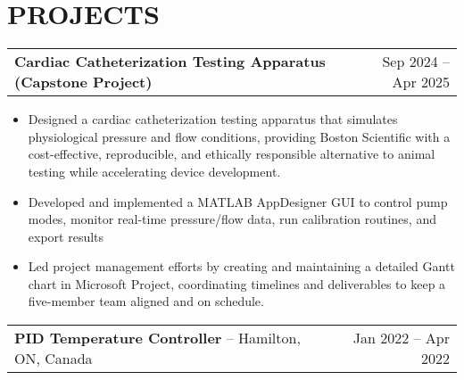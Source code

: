 \documentclass[a4paper,10pt]{article}
\begin{document}
\section{PROJECTS}
\begin{tabularx}{\linewidth}{@{}X r@{}}
\begin{minipage}[t]{\linewidth}
  \textbf{Cardiac Catheterization Testing Apparatus (Capstone Project)}
\end{minipage}
&     Sep 2024 -- Apr 2025
\end{tabularx}
\begin{itemize}[nosep,after=\strut, leftmargin=1em, itemsep=3pt,label=--]
  \item Designed a cardiac catheterization testing apparatus that simulates physiological pressure and flow conditions, providing Boston Scientific with a cost-effective, reproducible, and ethically responsible alternative to animal testing while accelerating device development.
\item Developed and implemented a MATLAB AppDesigner GUI to control pump modes, monitor real-time pressure/flow data, run calibration routines, and export results
\item Led project management efforts by creating and maintaining a detailed Gantt chart in Microsoft Project, coordinating timelines and deliverables to keep a five-member team aligned and on schedule.
\end{itemize}
\begin{tabularx}{\linewidth}{@{}X r@{}}
\begin{minipage}[t]{\linewidth}
  \textbf{PID Temperature Controller}
 -- Hamilton, ON, Canada\end{minipage}
&     Jan 2022 -- Apr 2022
\end{tabularx}
\end{document}
